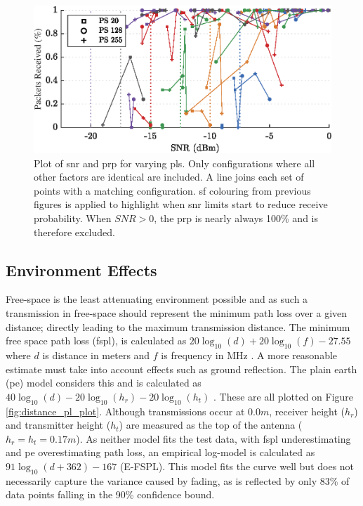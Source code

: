 \begin{figure}[H]
    \centering
   	\includegraphics{Figures/pl_pp_plot}
    \caption[Effect of Packet Length on \ac{snr} and \ac{prp}]{
    Plot of \ac{snr} and \ac{prp} for varying \ac{pl}s. Only configurations where all other factors are identical are included. A line joins each set of points with a matching configuration. \ac{sf} colouring from previous figures is applied to highlight when \ac{snr} limits start to reduce receive probability. When $SNR > 0$, the \ac{prp} is nearly always 100\% and is therefore excluded.
    }
    \label{fig:pl_pp_plot}
\end{figure}

\subsection{Environment Effects}\label{sec:environment_propagation}
Free-space is the least attenuating environment possible and as such a transmission in free-space should represent the minimum path loss over a given distance; directly leading to the maximum transmission distance. The minimum free space path loss (\ac{fspl}), is calculated as $20\log_{10}(d) + 20\log_{10}(f) - 27.55$ where $d$ is distance in meters and $f$ is frequency in MHz \cite{3YP:ANTENNA_BOOK}. A more reasonable estimate must take into account effects such as ground reflection. The plain earth (\ac{pe}) model considers this and is calculated as $40\log_{10}(d) - 20\log_{10}(h_r) - 20\log_{10}(h_t)$ \cite{3YP:COMBINING_MODELS}. These are all plotted on Figure \ref{fig:distance_pl_plot}. Although transmissions occur at $0.0m$, receiver height ($h_r$) and transmitter height ($h_t$) are measured as the top of the antenna ($h_r = h_t = 0.17m$). As neither model fits the test data, with \ac{fspl} underestimating and \ac{pe} overestimating path loss, an empirical log-model is calculated as $91\log_{10}(d+362)-167$ (E-FSPL). This model fits the curve well but does not necessarily capture the variance caused by fading, as is reflected by only 83\% of data points falling in the 90\% confidence bound.

